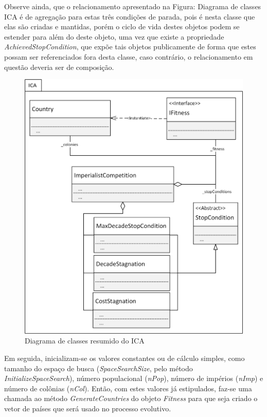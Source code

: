 Observe ainda, que o relacionamento apresentado na Figura: Diagrama de classes ICA é de agregação para estas três condições de parada, pois é nesta classe que elas são criadas e mantidas, porém o ciclo de vida destes objetos podem se estender para além do deste objeto, uma vez que existe a propriedade \emph{AchievedStopCondition}, que expõe tais objetos publicamente de forma que estes possam ser referenciados fora desta classe, caso contrário, o relacionamento em questão deveria ser de composição.

\begin{figure}[h]
	\centering	
	\includegraphics[scale=0.9]{Figuras/ClassesICA-ICAResumed.png}
	\caption{Diagrama de classes resumido do ICA }
	\label{fig:ClassesICA-ICAResumed}
	\end{figure}
    
Em seguida, inicializam-se os valores constantes ou de cálculo simples, como tamanho do espaço de busca (\emph{SpaceSearchSize}, pelo método \emph{InitializeSpaceSearch}), número populacional (\emph{nPop}), número de impérios (\emph{nImp}) e número de colônias (\emph{nCol}). Então, com estes valores já estipulados, faz-se uma chamada ao método \emph{GenerateCountries} do objeto \emph{Fitness} para que seja criado o vetor de países que será usado no processo evolutivo.


